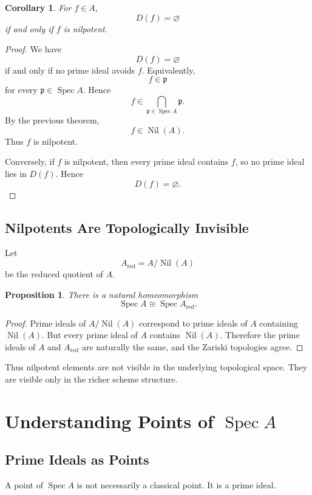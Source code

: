 \documentclass[12pt,a4paper]{article}
\newtheorem{corollary}[theorem]{Corollary}
\newtheorem{proposition}{Proposition}[section]
\newcommand{\Spec}{\operatorname{Spec}}
\newcommand{\Nil}{\operatorname{Nil}}
\newcommand{\mfp}{\mathfrak p}
\begin{document}
\begin{corollary}
	For \(f\in A\),
	\[
	D(f)=\varnothing
	\]
	if and only if \(f\) is nilpotent.
\end{corollary}

\begin{proof}
	We have
	\[
	D(f)=\varnothing
	\]
	if and only if no prime ideal avoids \(f\). Equivalently,
	\[
	f\in\mfp
	\]
	for every \(\mfp\in\Spec A\). Hence
	\[
	f\in \bigcap_{\mfp\in\Spec A}\mfp.
	\]
	By the previous theorem,
	\[
	f\in\Nil(A).
	\]
	Thus \(f\) is nilpotent.
	
	Conversely, if \(f\) is nilpotent, then every prime ideal contains \(f\), so no
	prime ideal lies in \(D(f)\). Hence
	\[
	D(f)=\varnothing.
	\]
\end{proof}

\subsection{Nilpotents Are Topologically Invisible}

Let
\[
A_{\mathrm{red}}=A/\Nil(A)
\]
be the reduced quotient of \(A\).

\begin{proposition}
	There is a natural homeomorphism
	\[
	\Spec A\cong \Spec A_{\mathrm{red}}.
	\]
\end{proposition}

\begin{proof}
	Prime ideals of \(A/\Nil(A)\) correspond to prime ideals of \(A\) containing
	\(\Nil(A)\). But every prime ideal of \(A\) contains \(\Nil(A)\). Therefore the
	prime ideals of \(A\) and \(A_{\mathrm{red}}\) are naturally the same, and the
	Zariski topologies agree.
\end{proof}

Thus nilpotent elements are not visible in the underlying topological space.
They are visible only in the richer scheme structure.

\section{Understanding Points of \(\Spec A\)}

\subsection{Prime Ideals as Points}

A point of \(\Spec A\) is not necessarily a classical point. It is a prime ideal.
\end{document}
